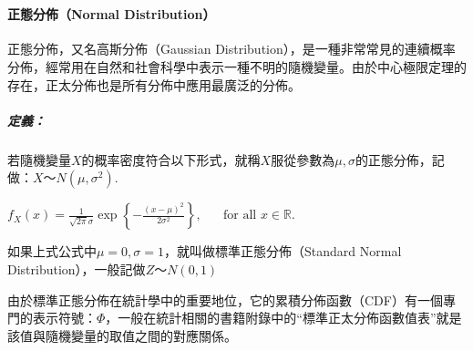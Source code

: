 \documentclass[11pt]{article}
\begin{document}
    \begin{center}
    \end{center}
    { \hspace*{\fill} \\}
    
    \hypertarget{ux6b63ux614bux5206ux4f48normal-distribution}{%
\paragraph{正態分佈（Normal
Distribution）}\label{ux6b63ux614bux5206ux4f48normal-distribution}}

正態分佈，又名高斯分佈（Gaussian
Distribution），是一種非常常見的連續概率分佈，經常用在自然和社會科學中表示一種不明的隨機變量。由於中心極限定理的存在，正太分佈也是所有分佈中應用最廣泛的分佈。

\hypertarget{ux5b9aux7fa9}{%
\subparagraph{定義：}\label{ux5b9aux7fa9}}

若隨機變量\(X\)的概率密度符合以下形式，就稱\(X\)服從參數為\(\mu, \sigma\)的正態分佈，記做：\(X～N(\mu,\sigma^2)\).

\(f_X (x) = \frac{1}{\sqrt{2 \pi } \sigma} \exp \left\{-\frac{(x - \mu)^2}{2 \sigma^2} \right\}, \hspace{20pt} \textrm{for all } x \in \mathbb{R}.\)

如果上式公式中\(\mu = 0, \sigma = 1\)，就叫做標準正態分佈（Standard
Normal Distribution），一般記做\(Z～N(0,1)\)

由於標準正態分佈在統計學中的重要地位，它的累積分佈函數（CDF）有一個專門的表示符號：\(\Phi\)，一般在統計相關的書籍附錄中的``標準正太分佈函數值表''就是該值與隨機變量的取值之間的對應關係。
\end{document}
